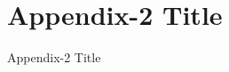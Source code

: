 \chapter{Appendix-2 Title}{Appendix-2 Title}
\label{App:Appendix2}
\renewcommand{\thesection}{B.\arabic{section}}